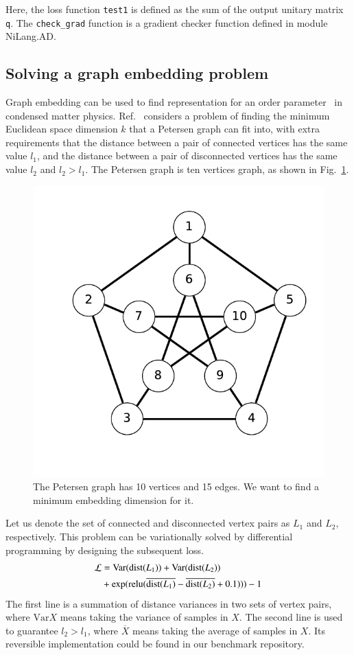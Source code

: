 \documentclass{article}
\newcommand{\<}{\langle}
\renewcommand{\>}{\rangle}
\newcommand{\Var}{{\mathrm{Var}}}
\newcommand{\Fig}[1]{Fig.~\ref{#1}}
\newcommand{\Ref}[1]{Ref.~\cite{#1}}
\theoremstyle{definition}\newtheorem{definition}{\textit{Definition}}
\begin{document}
Here, the loss function \texttt{test1} is defined as the sum of the output unitary matrix \texttt{q}. The \texttt{check\_grad} function is a gradient checker function defined in module NiLang.AD.

\subsection{Solving a graph embedding problem}\label{sec:graph}
Graph embedding can be used to find representation for an order parameter~\cite{Takahashi2020} in condensed matter physics.
\Ref{Takahashi2020} considers a problem of finding the minimum Euclidean space dimension $k$ that a Petersen graph can fit into, with extra requirements that the distance between a pair of connected vertices has the same value $l_1$, and the distance between a pair of disconnected vertices has the same value $l_2$ and $l_2 > l_1$.
The Petersen graph is ten vertices graph, as shown in \Fig{fig:petersen}.\begin{figure}
    \centerline{\includegraphics[width=0.4\columnwidth,trim={0 1cm 0 0},clip]{petersen.pdf}}
    \caption{The Petersen graph has 10 vertices and 15 edges. We want to find a minimum embedding dimension for it.}\label{fig:petersen}
\end{figure}
Let us denote the set of connected and disconnected vertex pairs as $L_1$ and $L_2$, respectively. This problem can be variationally solved by differential programming by designing the subsequent loss.
\begin{align}
    \begin{split}
        \mathcal{L} &= \Var({\rm dist}(L_1)) + \Var({\rm dist}(L_2)) \\
        &+\exp({\rm relu}(\overline{{\rm dist}(L_1)} - \overline{{\rm dist}(L_2)} + 0.1))) - 1
    \end{split}
\end{align}
The first line is a summation of distance variances in two sets of vertex pairs, where $\Var{X}$ means taking the variance of samples in $X$.
The second line is used to guarantee $l_2 > l_1$, where $\overline{X}$ means taking the average of samples in $X$.
Its reversible implementation could be found in our benchmark repository.
\end{document}
